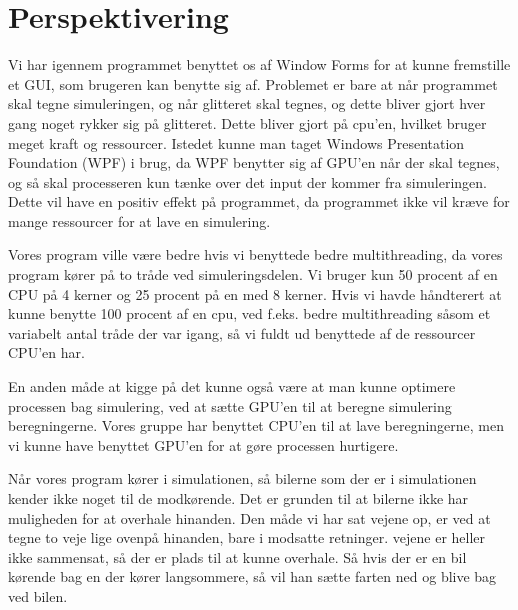 \chapter{Perspektivering}\label{Perspektivering}
Vi har igennem programmet benyttet os af Window Forms for at kunne fremstille et GUI, som brugeren kan benytte sig af. Problemet er bare at når programmet skal tegne simuleringen, og når glitteret skal tegnes, og dette bliver gjort hver gang noget rykker sig på glitteret. Dette bliver gjort på cpu'en, hvilket bruger meget kraft og ressourcer. Istedet kunne man taget Windows Presentation Foundation (WPF) i brug, da WPF benytter sig af GPU'en når der skal tegnes, og så skal processeren kun tænke over det input der kommer fra simuleringen. Dette vil have en positiv effekt på programmet, da programmet ikke vil kræve for mange ressourcer for at lave en simulering.

\vspace{5mm}

Vores program ville være bedre hvis vi benyttede bedre multithreading, da vores program kører på to tråde ved simuleringsdelen. Vi bruger kun 50 procent af en CPU på 4 kerner og 25 procent på en med 8 kerner. Hvis vi havde håndterert at kunne benytte 100 procent af en cpu, ved f.eks. bedre multithreading såsom et variabelt antal tråde der var igang, så vi fuldt ud benyttede af de ressourcer CPU'en har.

\vspace{5mm}

En anden måde at kigge på det kunne også være at man kunne optimere processen bag simulering, ved at sætte GPU'en til at beregne simulering beregningerne. Vores gruppe har benyttet CPU'en til at lave beregningerne, men vi kunne have benyttet GPU'en for at gøre processen hurtigere.


\vspace{5mm}

Når vores program kører i simulationen, så bilerne som der er i simulationen kender ikke noget til de modkørende. Det er grunden til at bilerne ikke har muligheden for at overhale hinanden. Den måde vi har sat vejene op, er ved at tegne to veje lige ovenpå hinanden, bare i modsatte retninger. vejene er heller ikke sammensat, så der er plads til at kunne overhale. Så hvis der er en bil kørende bag en der kører langsommere, så vil han sætte farten ned og blive bag ved bilen.
